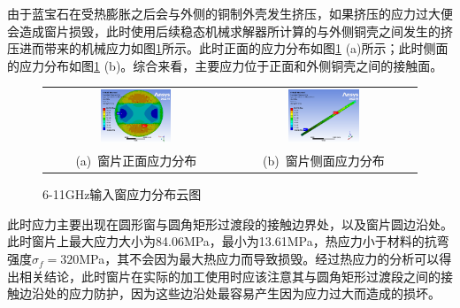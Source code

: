 \documentclass[master]{thesis-uestc}
\begin{document}
由于蓝宝石在受热膨胀之后会与外侧的铜制外壳发生挤压，如果挤压的应力过大便会造成窗片损毁，此时使用后续稳态机械求解器所计算的与外侧铜壳之间发生的挤压进而带来的机械应力如图\ref{fig:X输入应力分布}所示。此时正面的应力分布如图\ref{fig:X输入应力分布} (a)所示；此时侧面的应力分布如图\ref{fig:X输入应力分布} (b)。综合来看，主要应力位于正面和外侧铜壳之间的接触面。
\begin{figure}[!htb]
    \small
    \centering
    \begin{tabular}{@{\ }c@{\ }c}
        \includegraphics[width=0.4\textwidth]{pic/chapter3/窗片正面应力分布.png} & 
        \hspace{5pt}
        \includegraphics[width=0.4\textwidth]{pic/chapter3/窗片侧面应力分布.png}     \\
        \mbox{\small (a) 窗片正面应力分布}                                                                               & 
        \mbox{\small (b) 窗片侧面应力分布}                                                                                  \\
    \end{tabular}
    \caption{6-11GHz输入窗应力分布云图}
    \label{fig:X输入应力分布}
\end{figure}

此时应力主要出现在圆形窗与圆角矩形过渡段的接触边界处，以及窗片圆边沿处。此时窗片上最大应力大小为84.06MPa，最小为13.61MPa，热应力小于材料的抗弯强度\(\sigma_f = 320\)MPa，其不会因为最大热应力而导致损毁。经过热应力的分析可以得出相关结论，此时窗片在实际的加工使用时应该注意其与圆角矩形过渡段之间的接触边沿处的应力防护，因为这些边沿处最容易产生因为应力过大而造成的损坏。
\end{document}
